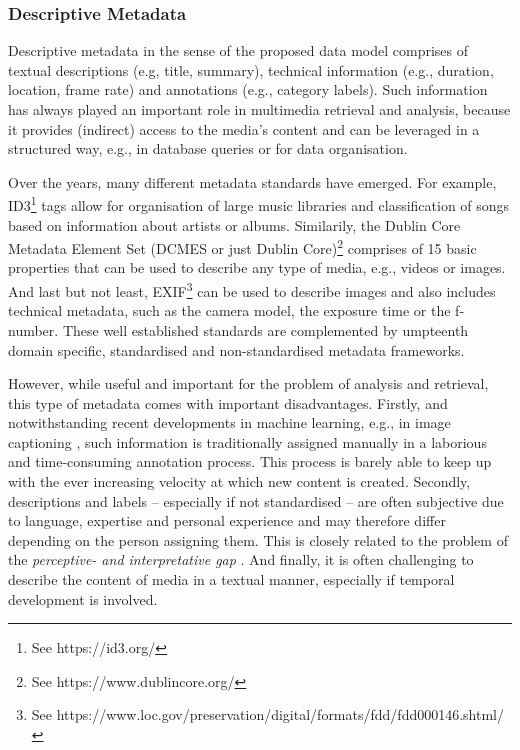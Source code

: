 \subsubsection{Descriptive Metadata}
Descriptive metadata in the sense of the proposed data model comprises of textual descriptions (e.g, title, summary), technical information (e.g., duration, location, frame rate) and annotations (e.g., category labels). Such information has always played an important role in multimedia retrieval and analysis, because it provides (indirect) access to the media's content and can be leveraged in a structured way, e.g., in database queries or for data organisation.

Over the years, many different metadata standards have emerged. For example, ID3\footnote{See https://id3.org/} tags allow for organisation of large music libraries and classification of songs based on information about artists or albums. Similarily, the Dublin Core Metadata Element Set (DCMES or just Dublin Core)\footnote{See https://www.dublincore.org/} comprises of 15 basic properties that can be used to describe any type of media, e.g., videos or images. And last but not least, EXIF\footnote{See https://www.loc.gov/preservation/digital/formats/fdd/fdd000146.shtml/} can be used to describe images and also includes technical metadata, such as the camera model, the exposure time or the f-number. These well established standards are complemented by umpteenth domain specific, standardised and non-standardised metadata frameworks.

However, while useful and important for the problem of analysis and retrieval, this type of metadata comes with important disadvantages. Firstly, and notwithstanding recent developments in machine learning, e.g., in image captioning \cite{Hossain:2019Comprehensive}, such information is traditionally assigned manually in a laborious and time-consuming annotation process. This process is barely able to keep up with the ever increasing velocity at which new content is created. Secondly, descriptions and labels -- especially if not standardised -- are often subjective due to language, expertise and personal experience and may therefore differ depending on the person assigning them. This is closely related to the problem of the \emph{perceptive- and interpretative gap} \cite{Rossetto:2018thesis}. And finally, it is often challenging to describe the content of media in a textual manner, especially if temporal development is involved.

